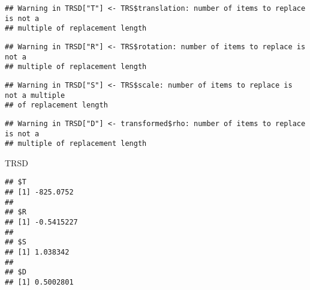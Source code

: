 \documentclass[
]{article}
\newenvironment{Shaded}{\begin{snugshade}}{\end{snugshade}}
\newcommand{\NormalTok}[1]{#1}
\newcommand{\OperatorTok}[1]{\textcolor[rgb]{0.81,0.36,0.00}{\textbf{#1}}}
\newcommand{\StringTok}[1]{\textcolor[rgb]{0.31,0.60,0.02}{#1}}
\begin{document}
\begin{verbatim}
## Warning in TRSD["T"] <- TRS$translation: number of items to replace is not a
## multiple of replacement length
\end{verbatim}

\begin{Shaded}
\end{Shaded}

\begin{verbatim}
## Warning in TRSD["R"] <- TRS$rotation: number of items to replace is not a
## multiple of replacement length
\end{verbatim}

\begin{Shaded}
\end{Shaded}

\begin{verbatim}
## Warning in TRSD["S"] <- TRS$scale: number of items to replace is not a multiple
## of replacement length
\end{verbatim}

\begin{Shaded}
\end{Shaded}

\begin{verbatim}
## Warning in TRSD["D"] <- transformed$rho: number of items to replace is not a
## multiple of replacement length
\end{verbatim}

\begin{Shaded}
\begin{Highlighting}[]
\NormalTok{TRSD}
\end{Highlighting}
\end{Shaded}

\begin{verbatim}
## $T
## [1] -825.0752
## 
## $R
## [1] -0.5415227
## 
## $S
## [1] 1.038342
## 
## $D
## [1] 0.5002801
\end{verbatim}
\end{document}
